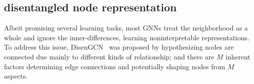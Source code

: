 \documentclass[accepted]{uai2021} %
\begin{document}



\subsection{disentangled node representation}

Albeit promising several learning tasks, most GNNs treat the neighborhood as a whole and ignore the inner-differences, learning noninterpretable representations. To address this issue, DisenGCN~\citep{Ma2019DisentangledGC} was proposed by hypothesizing nodes are connected due mainly to different kinds of relationship; and there are $M$ inherent factors determining edge connections and potentially shaping nodes from $M$ aspects.
\end{document}
